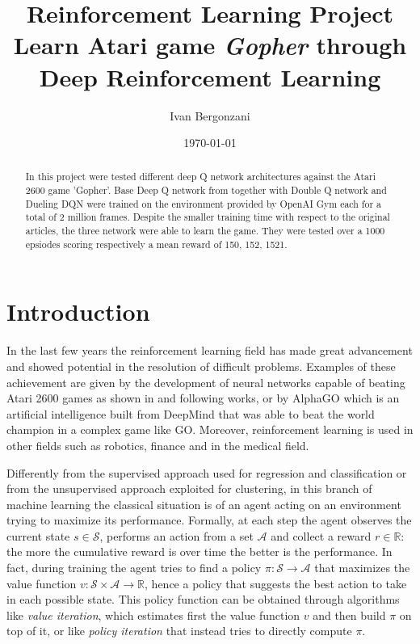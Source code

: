 \documentclass[article,11pt]{article}
\begin{document}
	
	\title{Reinforcement Learning Project\\Learn Atari game \textit{Gopher} through Deep Reinforcement Learning}
	\author{Ivan Bergonzani}
	\date{\today}
	\maketitle
	
	\begin{abstract}
		In this project were tested different deep Q network architectures against the Atari 2600 game 'Gopher'.
		Base Deep Q network from \cite{dqn2013}\cite{dqn2015} together with Double Q network \cite{doubledqn} and Dueling DQN \cite{duelingdqn} were trained on the environment provided by OpenAI Gym each for a total of 2 million frames. Despite the smaller training time with respect to the original articles, the three network were able to learn the game. They were tested over a 1000 epsiodes scoring respectively a mean reward of 150, 152, 1521.
		
	\end{abstract}
	
	
	\section{Introduction}
	 
	In the last few years the reinforcement learning field has made great advancement and showed potential in the resolution of difficult problems. Examples of these achievement are given by the development of  neural networks capable of beating Atari 2600 games as shown in \cite{dqn2013} and following works, or by AlphaGO which is an artificial intelligence built from DeepMind that was able to beat the world champion in a complex game like GO. Moreover, reinforcement learning is used in other fields such as robotics, finance and in the medical field.
	
	Differently from the supervised approach used for regression and classification or from the unsupervised approach exploited for clustering, in this branch of machine learning the classical situation is of an agent acting on an environment trying to maximize its performance. Formally, at each step the agent observes the current state $s\in\mathcal{S}$, performs an action from a set $\mathcal{A}$ and collect a reward $r\in\mathbb{R}$: the more the cumulative reward is over time the better is the performance. In fact, during training the agent tries to find a policy $\pi:\mathcal{S}\to\mathcal{A}$ that maximizes the value function $v: \mathcal{S}\times\mathcal{A}\to\mathbb{R}$, hence a policy that suggests the best action to take in each possible state. This policy function can be obtained through algorithms like \textit{value iteration}, which estimates first the value function $v$ and then build $\pi$ on top of it, or like \textit{policy iteration} that instead tries to directly compute $\pi$.
	
\end{document}
